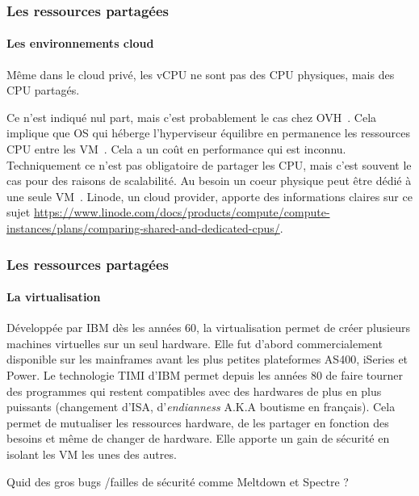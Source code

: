 \documentclass{beamer}
\begin{document}
    \begin{frame}
        \transdissolve
        \frametitle{Les ressources partagées}
        \framesubtitle{Les environnements cloud}
        Même dans le cloud privé, les vCPU ne sont pas des CPU physiques, mais des CPU partagés.

        Ce n'est indiqué nul part, mais c'est probablement le cas chez OVH~.
        Cela implique que OS qui héberge l'hyperviseur équilibre en permanence les ressources CPU entre les VM~.
        Cela a un coût en performance qui est inconnu.
        \bigbreak
        Techniquement ce n'est pas obligatoire de partager les CPU, mais c'est souvent le cas pour des raisons de scalabilité.
        Au besoin un coeur physique peut être dédié à une seule VM~.
        \bigbreak
        Linode, un cloud provider, apporte des informations claires sur ce sujet \url{https://www.linode.com/docs/products/compute/compute-instances/plans/comparing-shared-and-dedicated-cpus/}.

    \end{frame}

    \begin{frame}
        \transdissolve
        \frametitle{Les ressources partagées}
        \framesubtitle{La virtualisation}
        Développée par IBM dès les années 60, la virtualisation permet de créer plusieurs machines virtuelles sur un seul hardware.
        Elle fut d'abord commercialement disponible sur les mainframes avant les plus petites plateformes AS400, iSeries et Power.
        Le technologie TIMI d'IBM permet depuis les années 80 de faire tourner des programmes qui restent compatibles avec des hardwares de plus en plus puissants (changement d'ISA, d'\textit{endianness} A.K.A boutisme en français).
        \bigbreak
        Cela permet de mutualiser les ressources hardware, de les partager en fonction des besoins et même de changer de hardware.
        \bigbreak
        Elle apporte un gain de sécurité en isolant les VM les unes des autres.
        \begin{dangercolorbox}
            Quid des gros bugs /failles de sécurité comme Meltdown et Spectre ?
        \end{dangercolorbox}
    \end{frame}
\end{document}
